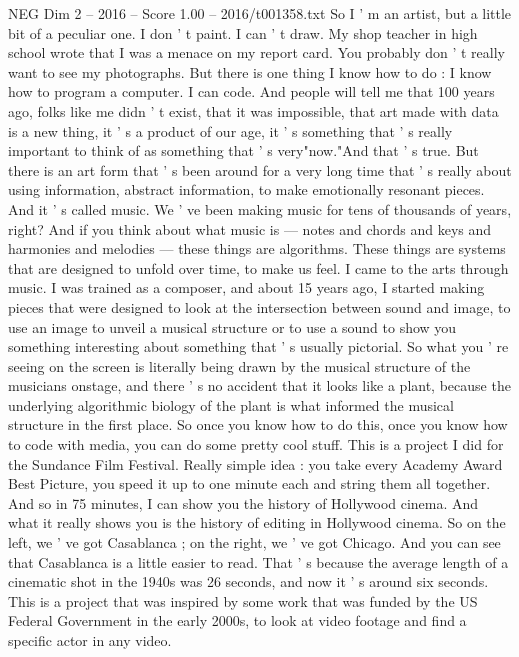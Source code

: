 \begin{textsample}{NEG Dim 2 – 2016 – Score 1.00 – 2016/t001358.txt}  \label{ex:f2_neg_055}
So I ' m an artist, but a little bit of a peculiar one.
I don ' t paint.
I can ' t draw.
My shop teacher in high school wrote that I was a menace on my report card.
You probably don ' t really want to see my photographs.
But there is one thing I know how to do : I know how to program a computer.
I can code.
And people will tell me that 100 years ago, folks like me didn ' t exist, that it was impossible, that art made with data is a new thing, it ' s a product of our age, it ' s something that ' s really important to think of as something that ' s very"now."And that ' s true.
But there is an art form that ' s been around for a very long time that ' s really about using information, abstract information, to make emotionally resonant pieces.
And it ' s called music.
We ' ve been making music for tens of thousands of years, right?
And if you think about what music is — notes and chords and keys and harmonies and melodies — these things are algorithms.
These things are systems that are designed to unfold over time, to make us feel.
I came to the arts through music.
I was trained as a composer, and about 15 years ago, I started making pieces that were designed to look at the intersection between sound and image, to use an image to unveil a musical structure or to use a sound to show you something interesting about something that ' s usually pictorial.
So what you ' re seeing on the screen is literally being drawn by the musical structure of the musicians onstage, and there ' s no accident that it looks like a plant, because the underlying algorithmic biology of the plant is what informed the musical structure in the first place.
So once you know how to do this, once you know how to code with media, you can do some pretty cool stuff.
This is a project I did for the Sundance Film Festival.
Really simple idea : you take every Academy Award Best Picture, you speed it up to one minute each and string them all together.
And so in 75 minutes, I can show you the history of Hollywood cinema.
And what it really shows you is the history of editing in Hollywood cinema.
So on the left, we ' ve got Casablanca ; on the right, we ' ve got Chicago.
And you can see that Casablanca is a little easier to read.
That ' s because the average length of a cinematic shot in the 1940s was 26 seconds, and now it ' s around six seconds.
This is a project that was inspired by some work that was funded by the US Federal Government in the early 2000s, to look at video footage and find a specific actor in any video.

\end{textsample}
